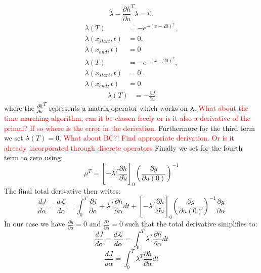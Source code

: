 \documentclass[10pt]{article}
\begin{document}
\begin{equation}
\dot\lambda - \frac{\partial h}{\partial u}^T \lambda = 0.
\end{equation}
\begin{align}
\lambda(T) &= -e^{-(x-20)^2},\\
\lambda(x_{start},t) &= 0,\\ 
\lambda(x_{end},t) &= 0 
\end{align}
\begin{align}
\lambda(T) &= -e^{-(x-20)^2},\\
\lambda(x_{start},t) &= 0,\\ 
\lambda(x_{end},t) &= 0 
\end{align}
\begin{align}
\lambda(T) &= -\frac{\partial J}{\partial u}
\end{align}
where the $\frac{\partial h}{\partial u}^T$ represents a matrix operator which works on $\lambda$. \textcolor{red}{What about the time marching algorithm, can it be chosen freely or is it also a derivative of the primal? If so where is the error in the derivation.}
Furthermore for the third term we set $\lambda(T)=0$. \textcolor{red}{What about BC?! Find appropriate derivation. Or is it already incorporated through discrete operators} Finally we set for the fourth term to zero using:
\begin{equation}
\mu^T = \left[- \lambda^T \frac{\partial h}{\partial\dot u} \right]_0 \left( \frac{\partial g}{\partial u(0)}\right)^{-1}
\end{equation}
The final total derivative then writes:
\begin{equation}
\frac{dJ}{d \alpha} =  \frac{d\mathcal{L}}{d \alpha} = \int_{0}^{T}\frac{\partial j}{\partial \alpha} + \lambda^T \frac{\partial h}{\partial \alpha} dt + \left[- \lambda^T \frac{\partial h}{\partial\dot u} \right]_0 \left( \frac{\partial g}{\partial u(0)}\right)^{-1} \frac{\partial g}{\partial\alpha}
\end{equation}
In our case we have $\frac{\partial g}{\partial\alpha}=0$ and $\frac{\partial j}{\partial \alpha}=0$ such that the total derivative simplifies to:
\begin{equation}
\frac{dJ}{d \alpha} =  \frac{d\mathcal{L}}{d \alpha} = \int_{0}^{T} \lambda^T \frac{\partial h}{\partial \alpha} dt
\end{equation}
\begin{equation}
\frac{dJ}{d \alpha} = \int_{0}^{T} \lambda^T \frac{\partial h}{\partial \alpha} dt
\end{equation}
\newpage
\end{document}

